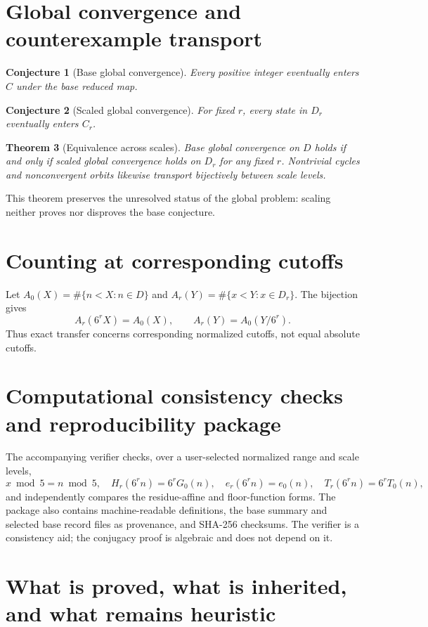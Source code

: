 \documentclass[11pt]{article}
\newtheorem{theorem}{Theorem}[section]
\newtheorem{conjecture}[theorem]{Conjecture}
\theoremstyle{remark}\newtheorem{remark}[theorem]{Remark}\newtheorem{example}[theorem]{Example}
\begin{document}
\section{Global convergence and counterexample transport}
\begin{conjecture}[Base global convergence]
Every positive integer eventually enters $C$ under the base reduced map.
\end{conjecture}
\begin{conjecture}[Scaled global convergence]
For fixed $r$, every state in $D_r$ eventually enters $C_r$.
\end{conjecture}
\begin{theorem}[Equivalence across scales]
Base global convergence on $D$ holds if and only if scaled global convergence holds on $D_r$ for any fixed $r$. Nontrivial cycles and nonconvergent orbits likewise transport bijectively between scale levels.
\end{theorem}
This theorem preserves the unresolved status of the global problem: scaling neither proves nor disproves the base conjecture.

\section{Counting at corresponding cutoffs}
Let $A_0(X)=\#\{n<X:n\in D\}$ and $A_r(Y)=\#\{x<Y:x\in D_r\}$. The bijection gives
\[
A_r(6^rX)=A_0(X),\qquad A_r(Y)=A_0(Y/6^r).
\]
Thus exact transfer concerns corresponding normalized cutoffs, not equal absolute cutoffs.

\section{Computational consistency checks and reproducibility package}
The accompanying verifier checks, over a user-selected normalized range and scale levels,
\[
x\bmod5=n\bmod5,\quad H_r(6^rn)=6^rG_0(n),\quad e_r(6^rn)=e_0(n),\quad T_r(6^rn)=6^rT_0(n),
\]
and independently compares the residue-affine and floor-function forms. The package also contains machine-readable definitions, the base summary and selected base record files as provenance, and SHA-256 checksums. The verifier is a consistency aid; the conjugacy proof is algebraic and does not depend on it.

\section{What is proved, what is inherited, and what remains heuristic}
\end{document}
